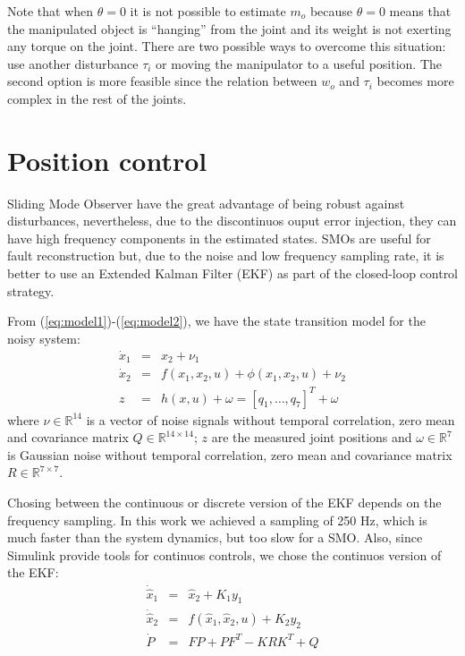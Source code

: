 \documentclass[conference,letterpaper]{ieeeconf}
\begin{document}
Note that when $\theta=0$ it is not possible to estimate $m_o$ because $\theta=0$ means that the manipulated object is ``hanging'' from the joint and its weight is not exerting any torque on the joint. There are two possible ways to overcome this situation: use another disturbance $\tau_i$ or moving the manipulator to a useful position. The second option is more feasible since the relation between $w_o$ and $\tau_i$ becomes more complex in the rest of the joints. 

\section{Position control}
\label{sec:Control}
Sliding Mode Observer have the great advantage of being robust against disturbances, nevertheless, due to the discontinuos ouput error injection, they can have high frequency components in the estimated states. SMOs are useful for fault reconstruction but, due to the noise and low frequency sampling rate, it is better to use an Extended Kalman Filter (EKF) as part of the closed-loop control strategy.

From (\ref{eq:model1})-(\ref{eq:model2}), we have the state transition model for the noisy system:
\begin{eqnarray}
    \dot{x}_1 &=& x_2 + \nu_1\label{eq:noisymodel1}\\
    \dot{x}_2 &=& f(x_1, x_2, u) + \phi(x_1, x_2, u) + \nu_2\label{eq:noisymodel2}\\
    z &=& h(x,u) + \omega = [q_1,\dots,q_7]^T + \omega
\end{eqnarray}
where $\nu \in\mathbb{R}^14$ is a vector of noise signals without temporal correlation, zero mean and covariance matrix $Q\in\mathbb{R}^{14\times 14}$; $z$ are the measured joint positions and $\omega\in\mathbb{R}^7$ is Gaussian noise without temporal correlation, zero mean and covariance matrix $R\in\mathbb{R}^{7\times 7}$.

Chosing between the continuous or discrete version of the EKF depends on the frequency sampling. In this work we achieved a sampling of 250 Hz, which is much faster than the system dynamics, but too slow for a SMO. Also, since Simulink provide tools for continuos controls, we chose the continuos version of the EKF:
\begin{eqnarray}
  \dot{\hat{x}}_1 &=& \hat{x}_2 + K_1 y_1 \label{eq:ekf1}\\
  \dot{\hat{x}}_2 &=& f(\hat{x}_1, \hat{x}_2, u) + K_2 y_2\label{eq:ekf2}\\
  \dot{P} &=& FP + PF^T - KRK^T + Q\label{eq:ekf3}
\end{eqnarray}
\end{document}
